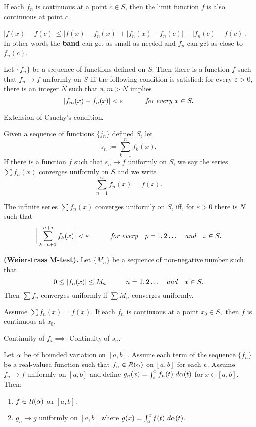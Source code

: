 \documentclass[10pt,a4paper]{book}
\begin{document}
\begin{Thm}
\fuc If each $f_n$ is continuous at a point $c \in S$, then the limit function $f$ is also continuous at point $c$.
\end{Thm}
\PP $|f(x) - f(c)| \leq | f(x) - f_n(x)| + |f_n(x) - f_n(c)| +|f_n(c)- f(c)|$. In other words the \textbf{band} can get as small as needed and $f_n$ can get as close to $f_n(c)$.
\begin{Thm}
Let $\{f_n\}$ be a sequence of functions defined  on $S$. Then there is a function $f$ such that $f_n \rightarrow f$ uniformly on $S$ iff the following condition is satisfied: for every $\varepsilon >0$, there is an integer $N$ such that $n,m >N$ implies
$$|f_m(x) - f_n(x)| < \varepsilon \sp \textit{ for every } x \in S.$$
\end{Thm}
\PP Extension of Cauchy's condition.
\begin{deff}
Given a sequence of functions $\{f_n\}$ defined $S$, let
$$s_n := \sum_{k=1}^n f_k(x).$$
If there is a function $f$ such that $s_n \rightarrow f$ uniformly on $S$, we say the series $\sum f_n(x)$ converges uniformly on $S$ and we write
$$\sum_{n=1}^\infty f_n(x) = f(x).$$

\end{deff}
\begin{Thm}
The infinite series $\sum f_n(x)$ converges uniformly on $S$, iff, for $\varepsilon >0$ there is $N$ such that
$$\bigg|\sum_{k = n +1}^{n + p}f_k(x)\bigg| < \varepsilon \sp \textit{ for every }\ \  p = 1,2 \dots \ \ \textit{ and } \ \ x \in S.$$
\end{Thm}
\begin{Thm}
\textbf{(Weierstrass M-test).} Let $\{M_n\}$ be a sequence of non-negative number such that 
$$0 \leq |f_n(x)| \leq M_n\sp n = 1,2 \dots \ \ \textit{ and } \ \ x \in S.$$
Then $\sum f_n$ converges uniformly if $\sum M_n$ converges uniformly.
\end{Thm}
\begin{Thm}
Assume $\sum f_n(x) = f(x)$. If each $f_n$ is continuous at a point $x_0 \in S,$ then $f$ is continuous at $x_0$.
\end{Thm}
\PP Continuity of $f_n \implies$ Continuity of $s_n$.
\begin{Thm}
Let $\al$ be of bounded variation on $[a,b].$ Assume each term of the sequence $\{f_n\}$ be a real-valued function such that $f_n \in R(\al)$ on $[a,b]$ for each $n.$ Assume $f_n \rightarrow f$ uniformly on $[a,b]$ and define $g_n(x) =  \int_a^x f_n(t)\ \da(t)$ for $x \in [a,b]$. Then:
\begin{enumerate}
    \item $f \in R(\al)$ on $[a,b].$ 
    \item $g_n \rightarrow g$ uniformly on $[a,b]$ where $g(x) =  \int_a^x f(t)\ \da(t).$
\end{enumerate}
\end{Thm}
\end{document}
